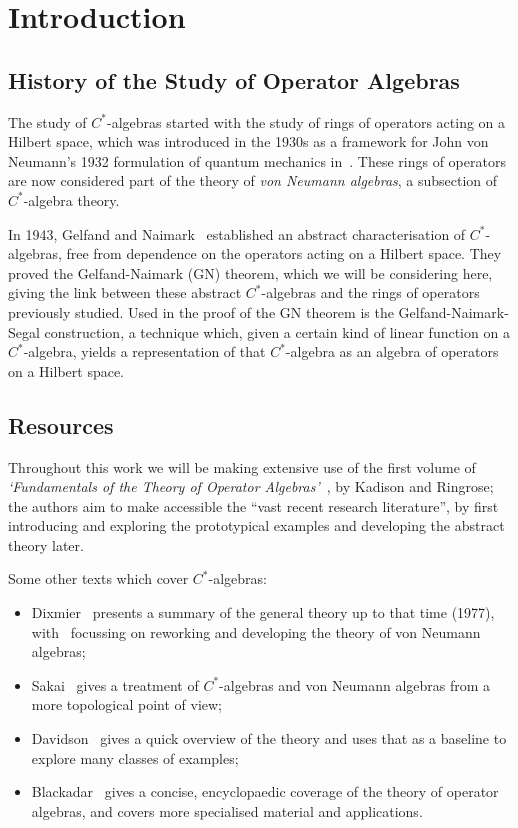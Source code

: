 \documentclass[11pt,a4paper]{report}
\theoremstyle{plain}
\theoremstyle{definition}
\newcommand{\1}{\mathbbm{1}}
\begin{document}
\chapter{Introduction}
\section{History of the Study of Operator Algebras}
The study of $C^\ast$-algebras started with the study of rings of operators 
acting on a Hilbert space, which was introduced in the 1930s as a framework for 
John von Neumann's 1932 formulation of quantum mechanics in~\cite{vonneumann32}. 
These rings of operators are now considered part of the theory of \emph{von 
Neumann algebras}, a subsection of $C^\ast$-algebra theory. 



{In 1943, Gelfand and Naimark~\cite{gelfand43} established an abstract 
characterisation of $C^\ast$-algebras, free from dependence on the operators 
acting on a Hilbert space. They proved the Gelfand-Naimark (GN) theorem, which 
we will be considering here, giving the link between these abstract 
$C^\ast$-algebras and the rings of operators previously studied. Used in the 
proof of the GN theorem is the Gelfand-Naimark-Segal construction, a technique 
which, given a certain kind of linear function on a $C^\ast$-algebra, yields a 
representation of that $C^\ast$-algebra as an algebra of operators on a Hilbert 
space.} 

\section{Resources}
Throughout this work we will be making extensive use of the first volume of 
\emph{`Fundamentals of the Theory of Operator Algebras'}~\cite{kadison83,kadison86}, 
by Kadison and Ringrose; the authors aim to make 
accessible the ``vast recent research literature'', by first introducing and 
exploring the prototypical examples and developing the abstract theory later. 

	
Some other texts which cover $C^\ast$-algebras: 
\begin{itemize}
	\item 	Dixmier~\cite{dixmier77} presents a summary of the general theory up to 
	that time (1977), with~\cite{dixmier81} focussing on reworking and developing 
	the theory of von Neumann algebras; 
	\item 	Sakai~\cite{sakai71} gives a treatment of $C^\ast$-algebras and von 
	Neumann algebras from a more topological point of view; 
	\item	Davidson~\cite{davidson96} gives a quick overview of the theory and uses 
	that as a baseline to explore many classes of examples;
	\item 	Blackadar~\cite{blackadar06} gives a concise, encyclopaedic coverage of 
	the theory of operator algebras, and covers more specialised material and 
	applications. 

\end{itemize}
	
\end{document}
